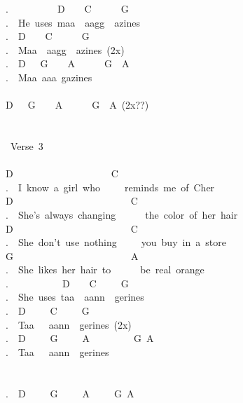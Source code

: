 {.\ \ \ \ \ \ \ \ \ \ D\ \ \ \ C\ \ \ \ \ \ G\\
.\ \ He\ uses\ maa\ \ aagg\ \ azines\\
.\ \ D\ \ \ \ C\ \ \ \ \ \ G\\
.\ \ Maa\ \ aagg\ \ azines\ (2x)\\
.\ \ D\ \ \ G\ \ \ \ A\ \ \ \ \ \ G\ \ A\\
.\ \ Maa\ aaa\ gazines\\
\\
D\ \ \ G\ \ \ \ A\ \ \ \ \ \ G\ \ A\ (2x??)\\
\\
\\
\lbrack\ Verse\ 3\rbrack\\
\\
D\ \ \ \ \ \ \ \ \ \ \ \ \ \ \ \ \ \ \ \ C\\
.\ \ I\ know\ a\ girl\ who\ \ \ \ \ reminds\ me\ of\ Cher\\
D\ \ \ \ \ \ \ \ \ \ \ \ \ \ \ \ \ \ \ \ \ \ \ \ C\\
.\ \ She's\ always\ changing\ \ \ \ \ \ the\ color\ of\ her\ hair\\
D\ \ \ \ \ \ \ \ \ \ \ \ \ \ \ \ \ \ \ \ \ \ \ \ C\\
.\ \ She\ don't\ use\ nothing\ \ \ \ \ you\ buy\ in\ a\ store\\
G\ \ \ \ \ \ \ \ \ \ \ \ \ \ \ \ \ \ \ \ \ \ \ \ A\\
.\ \ She\ likes\ her\ hair\ to\ \ \ \ \ \ be\ real\ orange\\
.\ \ \ \ \ \ \ \ \ \ \ D\ \ \ \ C\ \ \ \ \ G\\
.\ \ She\ uses\ taa\ \ aann\ \ gerines\\
.\ \ D\ \ \ \ \ C\ \ \ \ \ G\\
.\ \ Taa\ \ \ aann\ \ gerines\ (2x)\\
.\ \ D\ \ \ \ \ G\ \ \ \ \ A\ \ \ \ \ \ \ \ \ G\ A\\
.\ \ Taa\ \ \ aann\ \ gerines\\
\\
\\
.\ \ D\ \ \ \ \ G\ \ \ \ \ A\ \ \ \ \ G\ A}
